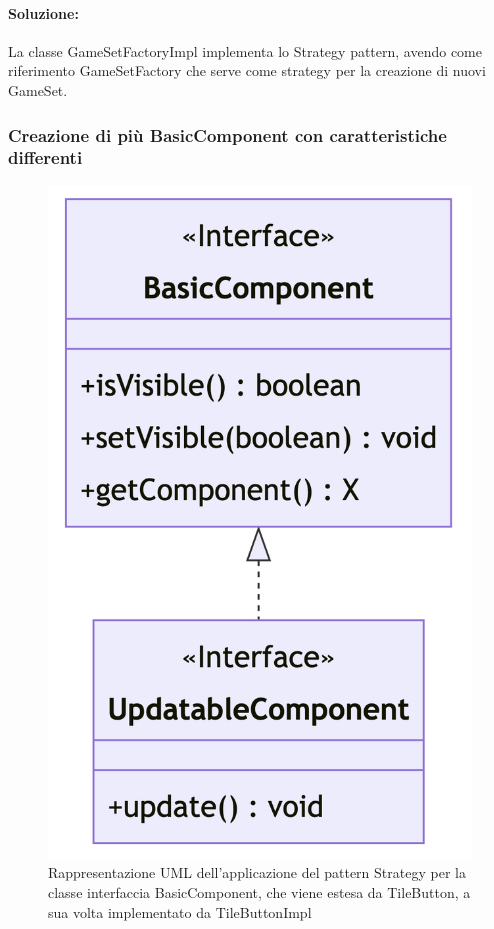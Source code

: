 \paragraph{Soluzione:}
La classe GameSetFactoryImpl implementa lo Strategy pattern, avendo come riferimento GameSetFactory che serve come strategy per la creazione di nuovi GameSet.

\subsubsection*{Creazione di più BasicComponent con caratteristiche differenti}
\begin{figure}[ht]
    \centering\includegraphics[scale=.5]{images/basiccomponent.png}
    \caption{Rappresentazione UML dell'applicazione del pattern Strategy per la classe interfaccia BasicComponent, che viene estesa da TileButton, a sua volta implementato da TileButtonImpl}
\end{figure}

